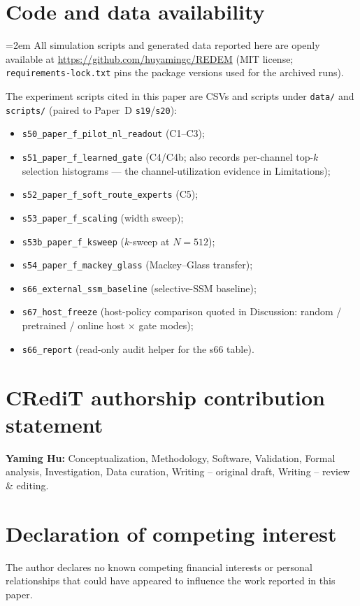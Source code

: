 \documentclass[preprint,12pt]{elsarticle}
\begin{document}
\section*{Code and data availability}
{\sloppy\emergencystretch=2em
All simulation scripts and generated data reported here are openly
available at \url{https://github.com/huyamingc/REDEM} (MIT license;
\texttt{requirements-lock.txt} pins the package versions used for the
archived runs).\par}
The experiment scripts cited in this paper are CSVs and scripts under
\texttt{data/} and \texttt{scripts/} (paired to
Paper~D \texttt{s19}/\texttt{s20}):
\begin{itemize}
\item \texttt{s50\_paper\_f\_pilot\_nl\_readout} (C1--C3);
\item \texttt{s51\_paper\_f\_learned\_gate} (C4/C4b; also records
per-channel top-$k$ selection histograms --- the channel-utilization
evidence in Limitations);
\item \texttt{s52\_paper\_f\_soft\_route\_experts} (C5);
\item \texttt{s53\_paper\_f\_scaling} (width sweep);
\item \texttt{s53b\_paper\_f\_ksweep} ($k$-sweep at $N=512$);
\item \texttt{s54\_paper\_f\_mackey\_glass} (Mackey--Glass transfer);
\item \texttt{s66\_external\_ssm\_baseline} (selective-SSM baseline);
\item \texttt{s67\_host\_freeze} (host-policy comparison quoted in
Discussion: random / pretrained / online host $\times$ gate modes);
\item \texttt{s66\_report} (read-only audit helper for the s66 table).
\end{itemize}

\section*{CRediT authorship contribution statement}
\textbf{Yaming Hu:} Conceptualization, Methodology, Software,
Validation, Formal analysis, Investigation, Data curation, Writing --
original draft, Writing -- review \& editing.

\section*{Declaration of competing interest}

The author declares no known competing financial interests or personal
relationships that could have appeared to influence the work reported in
this paper.
\end{document}
